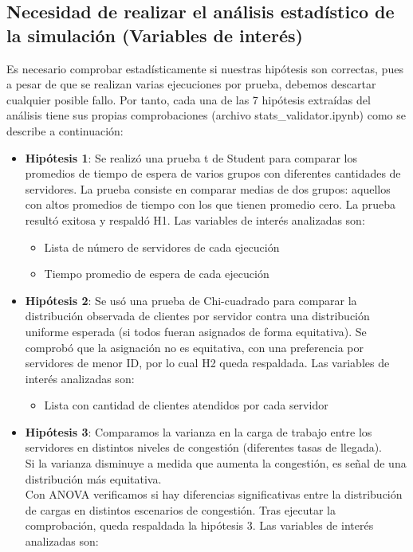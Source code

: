 \documentclass[12pt,a4paper]{article}
\begin{document}
\subsection{Necesidad de realizar el análisis estadístico de la simulación (Variables de interés)}
Es necesario comprobar estadísticamente si nuestras hipótesis son correctas, pues a pesar de que se realizan varias ejecuciones
por prueba, debemos descartar cualquier posible fallo. Por tanto, cada una de las 7 hipótesis extraídas del análisis tiene
sus propias comprobaciones (archivo stats\_validator.ipynb) como se describe a continuación:\\
\begin{itemize}
\item \textbf{Hipótesis 1}: Se realizó una prueba t de Student para comparar los promedios de tiempo de espera de varios grupos con diferentes cantidades de servidores. La prueba consiste en comparar medias de dos grupos: aquellos con altos promedios de tiempo con los que tienen promedio cero. La prueba resultó exitosa y respaldó H1. Las variables de interés analizadas son:
\begin{itemize}
\item Lista de número de servidores de cada ejecución
\item Tiempo promedio de espera de cada ejecución
\end{itemize}
\item \textbf{Hipótesis 2}: Se usó una prueba de Chi-cuadrado para comparar la distribución observada de clientes por servidor contra una distribución uniforme esperada (si todos fueran asignados de forma equitativa). Se comprobó que la asignación no es equitativa,
con una preferencia por servidores de menor ID, por lo cual H2 queda respaldada. Las variables de interés analizadas son:
\begin{itemize}
\item Lista con cantidad de clientes atendidos por cada servidor
\end{itemize}
\item \textbf{Hipótesis 3}: Comparamos la varianza en la carga de trabajo entre los servidores en distintos niveles de congestión  (diferentes tasas de llegada).\\
Si la varianza disminuye a medida que aumenta la congestión, es señal de una distribución más
equitativa. \\
Con ANOVA verificamos si hay diferencias significativas entre la distribución de cargas en distintos escenarios de congestión. Tras ejecutar la comprobación, queda respaldada la hipótesis 3. Las variables de interés analizadas son:

\end{itemize}
\end{document}
